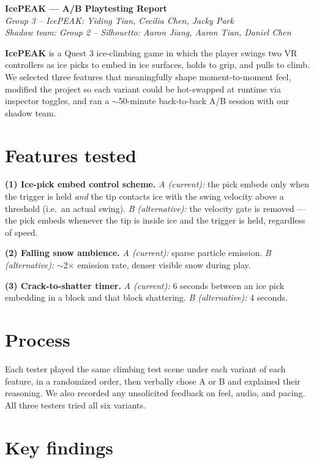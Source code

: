 \documentclass[11pt]{article}
\begin{document}
\begin{center}
    {\Large \textbf{IcePEAK --- A/B Playtesting Report}} \\[0.2em]
    \textit{Group 3 -- IcePEAK: Yiding Tian, Cecilia Chen, Jacky Park} \\
    \textit{Shadow team: Group 2 -- Silhouetto: Aaron Jiang, Aaron Tian, Daniel Chen}
\end{center}

\textbf{IcePEAK} is a Quest 3 ice-climbing game in which the player swings two VR controllers as ice picks to embed in ice surfaces, holds to grip, and pulls to climb. We selected three features that meaningfully shape moment-to-moment feel, modified the project so each variant could be hot-swapped at runtime via inspector toggles, and ran a $\sim$50-minute back-to-back A/B session with our shadow team.

\section*{Features tested}

\textbf{(1) Ice-pick embed control scheme.}
\emph{A (current):} the pick embeds only when the trigger is held \emph{and} the tip contacts ice with the swing velocity above a threshold (i.e.\ an actual swing).
\emph{B (alternative):} the velocity gate is removed --- the pick embeds whenever the tip is inside ice and the trigger is held, regardless of speed.

\textbf{(2) Falling snow ambience.}
\emph{A (current):} sparse particle emission.
\emph{B (alternative):} $\sim$2$\times$ emission rate, denser visible snow during play.

\textbf{(3) Crack-to-shatter timer.}
\emph{A (current):} 6 seconds between an ice pick embedding in a block and that block shattering.
\emph{B (alternative):} 4 seconds.

\section*{Process}

Each tester played the same climbing test scene under each variant of each feature, in a randomized order, then verbally chose A or B and explained their reasoning. We also recorded any unsolicited feedback on feel, audio, and pacing. All three testers tried all six variants.

\section*{Key findings}
\end{document}
